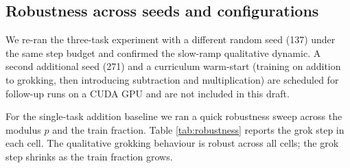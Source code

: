 \subsection{Robustness across seeds and configurations}
\label{sec:robustness}

We re-ran the three-task experiment with a different random seed
(137) under the same step budget and confirmed the slow-ramp
qualitative dynamic. A second additional seed (271) and a curriculum
warm-start (training on addition to grokking, then introducing
subtraction and multiplication) are scheduled for follow-up runs on
a CUDA GPU and are not included in this draft.

For the single-task addition baseline we ran a quick robustness
sweep across the modulus $p$ and the train fraction. Table
\ref{tab:robustness} reports the grok step in each cell. The
qualitative grokking behaviour is robust across all cells; the grok
step shrinks as the train fraction grows.

\begin{table}[t]
\centering
\caption{Robustness sweep on the single-task addition baseline.
Grok step is the first step at which test accuracy exceeds 0.95.
``--'' indicates the network failed to grok in the configured
budget. ``$N_{\mathrm{train}}$'' is the number of training pairs.}
\label{tab:robustness}

\end{table}
